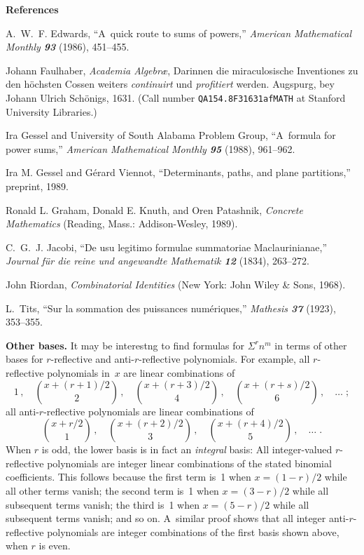 \bigskip
\centerline{\bf References}

\bib
[1]
A.~W.~F. Edwards, ``A~quick route to sums of powers,''
{\sl American Mathematical Monthly\/ \bf 93} (1986), 451--455.

\bib
[2] 
Johann Faulhaber,
{\sl Academia Algebr{\ae}}, Darinnen die miraculosische Inventiones zu
den h\"ochsten Cossen weiters {\it continuirt\/} und {\it
profitiert\/} werden. Augspurg, bey Johann Ulrich Sch\"onigs, 1631.
(Call number 
{\tt QA154.8{\kern3pt}F3{\kern3pt}1631a{\kern3pt}f{\kern3pt}MATH} 
at Stanford University Libraries.)

\bib
[3]
Ira Gessel and University of South Alabama Problem Group,
``A~formula for power sums,'' {\sl American Mathematical Monthly\/ \bf
95} (1988), 961--962.

\bib
[4]
Ira M. Gessel and G\'erard Viennot, ``Determinants, paths, and plane
partitions,'' pre\-print, 1989.

\bib
[5]
Ronald L. Graham, Donald E. Knuth, and Oren Patashnik,
{\sl Concrete Mathematics\/}
 (Reading, Mass.: Addison-Wesley, 1989).

\bib
[6] 
C.~G.~J. Jacobi, ``De usu legitimo formulae summatoriae
Maclaurinianae,'' {\sl Journal f\"ur die reine und angewandte
Mathematik\/ \bf 12} (1834), 263--272.

\bib
[7]
John Riordan, {\sl Combinatorial Identities\/} (New York: John Wiley
\& Sons, 1968).

\bib
[8]
L.~Tits, ``Sur la sommation des puissances num\'eriques,'' {\sl
Mathesis\/ \bf 37} (1923), 353--355.

\bye

\bigskip\noindent
{\bf Other bases.}\enspace
It may be interestng to find formulas for $\Sigma^rn^m$ in terms of
other bases for $r$-reflective and anti-$r$-reflective polynomials.
For example, all $r$-reflective polynomials in~$x$ are linear
combinations of
$$1\,,\quad {x+(r+1)/2\choose 2}\,,\quad {x+(r+3)/2\choose 4}\,,\quad
{x+(r+s)/2\choose 6}\,,\quad\ldots\;;$$
all anti-$r$-reflective polynomials are linear combinations of
$${x+r/2\choose 1}\,,\quad {x+(r+2)/2\choose 3}\,,\quad
{x+(r+4)/2\choose 5}\,,\quad \ldots\;.$$
When $r$ is odd, the lower basis is in fact an {\it integral\/} basis:
All integer-valued $r$-reflective polynomials are integer linear
combinations of the stated binomial coefficients. This follows because
the first term is~1 when $x=(1-r)/2$ while all other terms vanish; the
second term is~1 when $x=(3-r)/2$ while all subsequent terms vanish;
the third is~1 when $x=(5-r)/2$ while all subsequent terms vanish; and
so on. A~similar proof shows that all integer anti-$r$-reflective
polynomials are integer combinations of the first basis shown above,
when $r$ is even.

